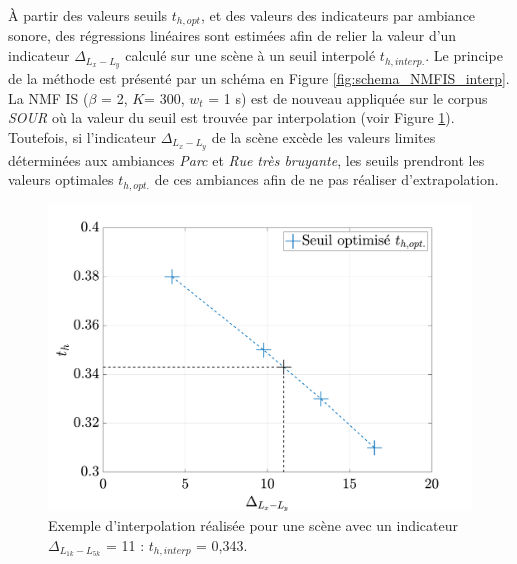 À partir des valeurs seuils $t_{h,opt}$, et des valeurs des indicateurs par ambiance sonore, des régressions linéaires sont estimées afin de relier la valeur d'un indicateur $\Delta_{L_x-L_y}$ calculé sur une scène à un seuil interpolé $t_{h,interp.}$. Le principe de la méthode est présenté par un schéma en Figure \ref{fig:schema_NMFIS_interp}.
La NMF IS ($\beta$ = 2, $K$= 300, $w_t$ = 1 s) est de nouveau appliquée sur le corpus \textit{SOUR} où la valeur du seuil est trouvée par interpolation (voir Figure \ref{fig:interpolation}). 
Toutefois, si l'indicateur $\Delta_{L_x-L_y}$ de la scène excède les valeurs limites déterminées aux ambiances \textit{Parc} et \textit{Rue très bruyante}, les seuils prendront les valeurs optimales $t_{h,opt.}$ de ces ambiances afin de ne pas réaliser d'extrapolation.  

\begin{figure}[h]
\centering
\includegraphics[width=.7\linewidth]{./figures/resultats/interpolationOpt.pdf}
\caption{Exemple d'interpolation réalisée pour une scène avec un indicateur $\Delta_{L_{1k}-L_{5k}}$ = 11 : $t_{h,interp}$ = 0,343.}
\label{fig:interpolation}
\end{figure}

